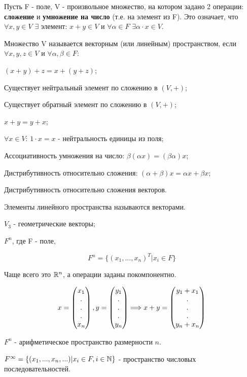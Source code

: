 \documentclass[../main.tex]{subfiles}
\begin{document}
Пусть F - поле, V - произвольное множество, на котором задано 2 операции:
\textbf{сложение} и \textbf{умножение на число} (т.е. на элемент из F). Это
означает, что $\forall x,y\in V$ $\exists$ элемент: $x + y\in V$ и $\forall \alpha\in F$ 
$\exists\alpha\cdot x\in V$.

Множество V называется векторным (или линейным) пространством, если 
$\forall x,y,z\in V$ и $\forall\alpha,\beta\in F$:

\void{} $(x+y)+z = x+(y+z)$;

\void{} Существует нейтральный элемент по сложению в $(V, +)$;

\void{} Существует обратный элемент по сложению в $(V, +)$;

\void{} $x + y = y + x$;

\void{} $\forall x\in V$: $1\cdot x = x$ - нейтральность единицы из поля;

\void{} Ассоциативность умножения на число: $\beta(\alpha x) = (\beta\alpha) x$;

\void{} Дистрибутивность относительно сложения: $(\alpha +\beta)x = \alpha x + \beta x$;

\void{} Дистрибутивность относительно сложения векторов.

\void{} Элементы линейного пространства называются векторами.

\void{}

\void{} $V_3$ - геометрические векторы;

\void{} $F^n$, где F - поле,

$$F^n = \{ (x_1,...,x_n)^T \vert x_i\in F \}$$

Чаще всего это $\mathbb{R}^n$, а операции заданы покомпонентно.

$$ x =  \begin{pmatrix} x_1\\.\\.\\.\\x_n\end{pmatrix}, y = \begin{pmatrix} y_1\\.\\.\\.\\y_n\end{pmatrix} \Longrightarrow x+y = \begin{pmatrix} y_1+x_1\\.\\.\\.\\y_n+x_n\end{pmatrix} $$

$F^n$ - арифметическое пространство размерности $n$.

\void{} $F^{\infty} = \{ (x_1,...,x_n,...) \vert x_i\in F, i\in\mathbb{N} \}$ - пространство
числовых последовательностей.
\end{document}
